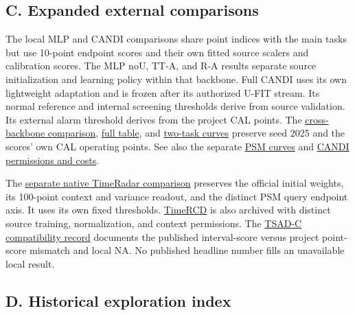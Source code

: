 \documentclass[
  american,
]{article}
\begin{document}
\subsection{C. Expanded external
comparisons}\label{c.-expanded-external-comparisons}

The local MLP and CANDI comparisons share point indices with the main
tasks but use 10-point endpoint scores and their own fitted source
scalers and calibration scores. The MLP noU, TT-A, and R-A results
separate source initialization and learning policy within that backbone.
Full CANDI uses its own lightweight adaptation and is frozen after its
authorized U-FIT stream. Its normal reference and internal screening
thresholds derive from source validation. Its external alarm threshold
derives from the project CAL points. The
\href{../../docs/experiments/mlp_replay_20261119/RESULTS.md}{cross-backbone
comparison},
\href{../../docs/experiments/mlp_replay_20261119/comparison.csv}{full
table}, and
\href{../../docs/experiments/mlp_replay_20261119/curves/SWAT_PR_ROC.png}{two-task
curves} preserve seed 2025 and the scores' own CAL operating points. See
also the separate
\href{../../docs/experiments/mlp_replay_20261119/curves/PSM_PR_ROC.png}{PSM
curves} and
\href{../../docs/experiments/candi_native_a_20261118/RESULTS.md}{CANDI
permissions and costs}.

The
\href{../../docs/experiments/timeradar_native_v_replay_20261120/RESULTS.md}{separate
native TimeRadar comparison} preserves the official initial weights, its
100-point context and variance readout, and the distinct PSM query
endpoint axis. It uses its own fixed thresholds.
\href{../../docs/experiments/timercd_fixed_20261117/logit/RESULTS.md}{TimeRCD}
is also archived with distinct source training, normalization, and
context permissions. The \href{../../docs/research_scope.md}{TSAD-C
compatibility record} documents the published interval-score versus
project point-score mismatch and local NA. No published headline number
fills an unavailable local result.

\subsection{D. Historical exploration
index}\label{d.-historical-exploration-index}
\end{document}
